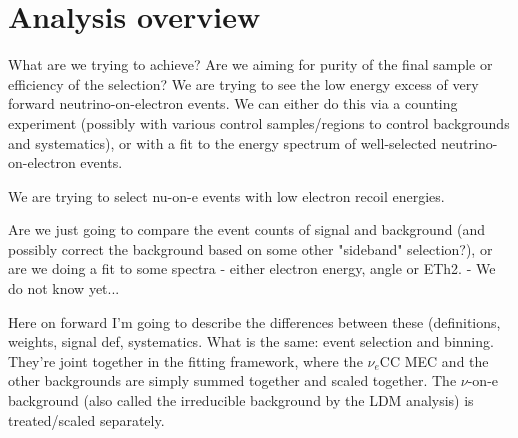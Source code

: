 \section{Analysis overview}
What are we trying to achieve? Are we aiming for purity of the final sample or efficiency of the selection? We are trying to see the low energy excess of very forward neutrino-on-electron events. We can either do this via a counting experiment (possibly with various control samples/regions to control backgrounds and systematics), or with a fit to the energy spectrum of well-selected neutrino-on-electron events.

We are trying to select nu-on-e events with low electron recoil energies.

Are we just going to compare the event counts of signal and background (and possibly correct the background based on some other "sideband" selection?), or are we doing a fit to some spectra - either electron energy, angle or ETh2. - We do not know yet...


Here on forward I'm going to describe the differences between these (definitions, weights, signal def, systematics. What is the same: event selection and binning. They're joint together in the fitting framework, where the $\nu_e$CC MEC and the other backgrounds are simply summed together and scaled together. The $\nu$-on-e background (also called the irreducible background by the LDM analysis) is treated/scaled separately.




